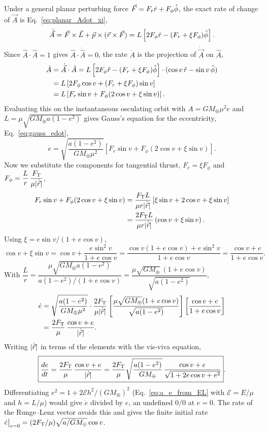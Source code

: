 \begin{enumerate}[label=(\alph*)]
	Under a general planar perturbing force $\vec F = F_r\hat r + F_\phi\hat\phi$, the exact rate of change of $\vec A$ is Eq.~\eqref{eq:planar_Adot_xi},
	\[
	\dot{\vec A} = \vec F\times\vec L + \vec p\times(\vec r\times\vec F) = L\left[2F_\phi\hat r - (F_r + \xi F_\phi)\hat\phi\right].
	\]
	Since $\hat A \cdot \hat A = 1$ gives $\hat A \cdot \dot{\hat A} = 0$, the rate $\dot A$ is the projection of $\dot{\vec A}$ on $\hat A$,
	\begin{align*}
		\dot A &= \dot{\vec A}\cdot\hat A = L\left[2F_\phi\hat r - (F_r+\xi F_\phi)\hat\phi\right]\cdot (\cos v\,\hat r - \sin v\,\hat\phi) \\
		&= L\left[ 2F_\phi\cos v + (F_r + \xi F_\phi)\sin v \right] \\
		&= L\left[ F_r\sin v + F_\phi(2\cos v + \xi\sin v) \right].
	\end{align*}
	Evaluating this on the instantaneous osculating orbit with $A = GM_\oplus\mu^2 e$ and $L = \mu\sqrt{GM_\oplus a(1-e^2)}$ gives Gauss's equation for the eccentricity, Eq.~\eqref{eq:gauss_edot},
	\begin{equation}
		\dot e = \sqrt{\frac{a(1-e^2)}{GM_\oplus\mu^2}}\left[ F_r\sin v + F_\phi(2\cos v + \xi\sin v) \right].
	\end{equation}
	Now we substitute the components for tangential thrust, $F_r = \xi F_\phi$ and $F_\phi = \dfrac{L}{r}\,\dfrac{F_{\rm T}}{\mu|\dot{\vec r}|}$,
	\begin{align*}
		F_r\sin v + F_\phi(2\cos v + \xi\sin v) &= \frac{F_{\rm T}L}{\mu r|\dot{\vec r}|}\left[ \xi\sin v + 2\cos v + \xi\sin v \right] \\
		&= \frac{2F_{\rm T}L}{\mu r|\dot{\vec r}|}\left(\cos v + \xi\sin v\right).
	\end{align*}
	Using $\xi = e\sin v/(1+e\cos v)$,
	\[
	\cos v + \xi\sin v = \cos v + \frac{e\sin^2 v}{1+e\cos v} = \frac{\cos v(1+e\cos v) + e\sin^2 v}{1+e\cos v} = \frac{\cos v + e}{1+e\cos v}.
	\]
	With $\dfrac{L}{r} = \dfrac{\mu\sqrt{GM_\oplus a(1-e^2)}}{a(1-e^2)/(1+e\cos v)} = \dfrac{\mu\sqrt{GM_\oplus}\,(1+e\cos v)}{\sqrt{a(1-e^2)}}$,
	\begin{align*}
		\dot e &= \sqrt{\frac{a(1-e^2)}{GM_\oplus\mu^2}} \cdot \frac{2F_{\rm T}}{\mu|\dot{\vec r}|} \left[\frac{\mu\sqrt{GM_\oplus}(1+e\cos v)}{\sqrt{a(1-e^2)}}\right] \left[\frac{\cos v + e}{1+e\cos v}\right] \\
		&= \frac{2F_{\rm T}}{\mu}\,\frac{\cos v + e}{|\dot{\vec r}|}.
	\end{align*}
	Writing $|\dot{\vec r}|$ in terms of the elements with the vis-viva equation,
	\begin{equation}
		\boxed{\frac{de}{dt} = \frac{2F_{\rm T}}{\mu}\,\frac{\cos v + e}{|\dot{\vec r}|} = \frac{2F_{\rm T}}{\mu}\sqrt{\frac{a(1-e^2)}{GM_\oplus}}\,\frac{\cos v + e}{\sqrt{1+2e\cos v+e^2}}}.
		\label{eq:prob8_edot}
	\end{equation}
	Differentiating $e^2 = 1 + 2\mathcal E h^2/(GM_\oplus)^2$ (Eq.~\eqref{eq:a_e_from_EL} with $\mathcal E=E/\mu$ and $h=L/\mu$) would give $\dot e$ divided by $e$, an undefined $0/0$ at $e=0$. The rate of the Runge--Lenz vector avoids this and gives the finite initial rate $\dot e\big|_{e=0} = (2F_{\rm T}/\mu)\sqrt{a/GM_\oplus}\cos v$.
	

\end{enumerate}

